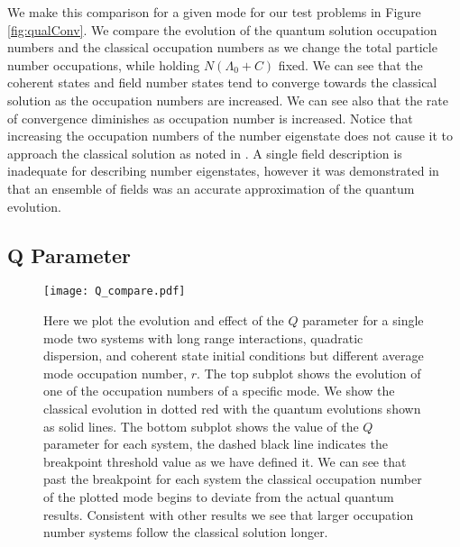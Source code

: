 \documentclass[aps,prd,twocolumn,superscriptaddress]{revtex4-1}
\begin{document}
We make this comparison for a given mode for our test problems in Figure \ref{fig:qualConv}. We compare the evolution of the quantum solution occupation numbers and the classical occupation numbers as we change the total particle number occupations, while holding $N(\Lambda_0 + C)$ fixed. We can see that the coherent states and field number states tend to converge towards the classical solution as the occupation numbers are increased. We can see also that the rate of convergence diminishes as occupation number is increased. Notice that increasing the occupation numbers of the number eigenstate does not cause it to approach the classical solution as noted in \cite{Hertzberg2016, Sikivie2017}. A single field description is inadequate for describing number eigenstates, however it was demonstrated in \cite{Hertzberg2016} that an ensemble of fields was an accurate approximation of the quantum evolution.

\subsection{Q Parameter}

\begin{figure}
	\texttt{[image: Q\_compare.pdf]}
	\caption{ Here we plot the evolution and effect of the $Q$ parameter for a single mode two systems with long range interactions, quadratic dispersion, and coherent state initial conditions but different average mode occupation number, $r$. The top subplot shows the evolution of one of the occupation numbers of a specific mode. We show the classical evolution in dotted red with the quantum evolutions shown as solid lines. The bottom subplot shows the value of the $Q$ parameter for each system, the dashed black line indicates the breakpoint threshold value as we have defined it. We can see that past the breakpoint for each system the classical occupation number of the plotted mode begins to deviate from the actual quantum results. Consistent with other results we see that larger occupation number systems follow the classical solution longer. }
	\label{fig:Qparam}
\end{figure}

\begin{comment}
\begin{figure}
	\texttt{[image: all\_Q.pdf]}
	\caption{ Here we show the breaktime as defined by the $Q$ parameter for each test problem and a number of different total occupation numbers. Nonzero interaction constants are given, in all cases the initial conditions are a coherent state. We can see that there is an approximate logarithmic enhancement in the breaktime as a function of the total number of particles for each system. }
	\label{fig:Qparam}
\end{figure}
\end{comment}
\end{document}
